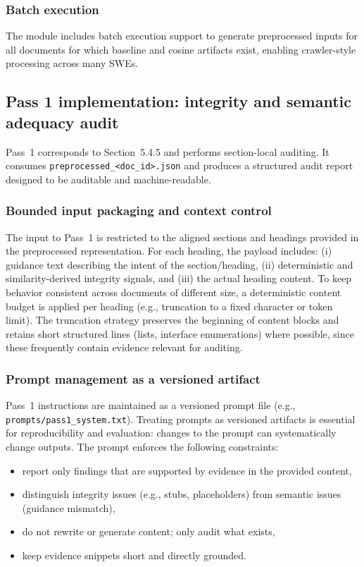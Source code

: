 \subsubsection{Batch execution}
The module includes batch execution support to generate preprocessed inputs for all documents for which baseline and cosine artifacts exist, enabling crawler-style processing across many SWEs.

\subsection{Pass 1 implementation: integrity and semantic adequacy audit}
Pass~1 corresponds to Section~5.4.5 and performs section-local auditing. It consumes \texttt{preprocessed\_\textless doc\_id\textgreater.json} and produces a structured audit report designed to be auditable and machine-readable.

\subsubsection{Bounded input packaging and context control}
The input to Pass~1 is restricted to the aligned sections and headings provided in the preprocessed representation. For each heading, the payload includes: (i) guidance text describing the intent of the section/heading, (ii) deterministic and similarity-derived integrity signals, and (iii) the actual heading content. To keep behavior consistent across documents of different size, a deterministic content budget is applied per heading (e.g., truncation to a fixed character or token limit). The truncation strategy preserves the beginning of content blocks and retains short structured lines (lists, interface enumerations) where possible, since these frequently contain evidence relevant for auditing.

\subsubsection{Prompt management as a versioned artifact}
Pass~1 instructions are maintained as a versioned prompt file (e.g., \texttt{prompts/pass1\_system.txt}). Treating prompts as versioned artifacts is essential for reproducibility and evaluation: changes to the prompt can systematically change outputs. The prompt enforces the following constraints:
\begin{itemize}
    \item report only findings that are supported by evidence in the provided content,
    \item distinguish integrity issues (e.g., stubs, placeholders) from semantic issues (guidance mismatch),
    \item do not rewrite or generate content; only audit what exists,
    \item keep evidence snippets short and directly grounded.
\end{itemize}

